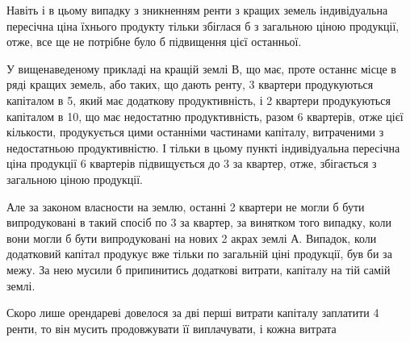 Навіть і в цьому випадку з зникненням ренти з кращих земель індивідуальна
пересічна ціна їхнього продукту тільки збіглася б з загальною ціною продукції,
отже, все ще не потрібне було б підвищення цієї останньої.

У вищенаведеному прикладі на кращій землі В, що має, проте останнє
місце в ряді кращих земель, або таких, що дають ренту, 3 квартери продукуються
капіталом в 5, який має додаткову продуктивність, і 2 квартери
продукуються капіталом в 10, що має недостатню продуктивність,
разом 6 квартерів, отже  цієї кількости, продукується цими
останніми частинами капіталу, витраченими з недостатньою продуктивністю.
І тільки в цьому пункті індивідуальна пересічна ціна продукції 6 квартерів
підвищується до 3 за квартер, отже, збігається з загальною ціною
продукції.

Але за законом власности на землю, останні 2 квартери не могли б бути
випродуковані в такий спосіб по 3 за квартер, за винятком того
випадку, коли вони могли б бути випродуковані на нових 2 акрах землі
А. Випадок, коли додатковий капітал продукує вже тільки по загальній ціні
продукції, був би за межу. За нею мусили б припинитись додаткові витрати,
капіталу на тій самій землі.

Скоро лише орендареві довелося за дві перші витрати капіталу заплатити
4 ренти, то він мусить продовжувати її виплачувати, і кожна витрата
\parbreak{}  %
